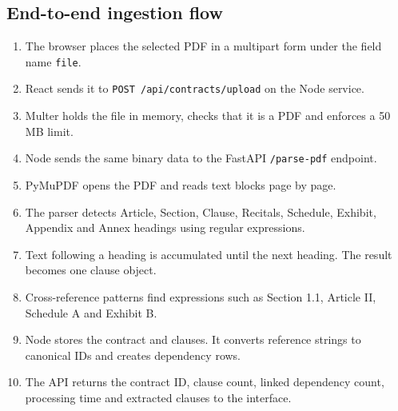\documentclass[11pt,letterpaper]{article}
\begin{document}
\subsection{End-to-end ingestion flow}
\begin{enumerate}
  \item The browser places the selected PDF in a multipart form under the field name \texttt{file}.
  \item React sends it to \texttt{POST /api/contracts/upload} on the Node service.
  \item Multer holds the file in memory, checks that it is a PDF and enforces a 50 MB limit.
  \item Node sends the same binary data to the FastAPI \texttt{/parse-pdf} endpoint.
  \item PyMuPDF opens the PDF and reads text blocks page by page.
  \item The parser detects Article, Section, Clause, Recitals, Schedule, Exhibit, Appendix and Annex headings using regular expressions.
  \item Text following a heading is accumulated until the next heading. The result becomes one clause object.
  \item Cross-reference patterns find expressions such as Section 1.1, Article II, Schedule A and Exhibit B.
  \item Node stores the contract and clauses. It converts reference strings to canonical IDs and creates dependency rows.
  \item The API returns the contract ID, clause count, linked dependency count, processing time and extracted clauses to the interface.
\end{enumerate}
\end{document}
